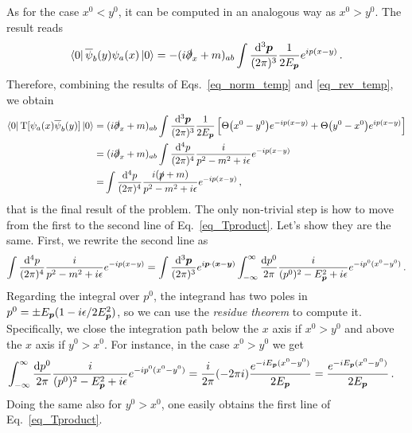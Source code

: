 \begin{sol}
    As for the case $x^0 < y^0$, it can be computed in an analogous way as $x^0 > y^0$. The result reads
    \begin{equation}
    \label{eq_rev_temp}
        \bra{0}\overline{\psi}_b(y)\psi_{a}(x)\ket{0} = -(i\slashed{\partial}_{x} + m)_{ab}\int \frac{{\rm d}^{3} \boldsymbol{p}}{(2\pi)^{3}}\frac{1}{2E_{\boldsymbol{p}}}e^{ip(x-y)} \, .
    \end{equation}
    Therefore, combining the results of Eqs.~\eqref{eq_norm_temp} and \eqref{eq_rev_temp}, we obtain
    \begin{equation} \label{eq_Tproduct}
    \begin{split}
        \bra{0}\mathbf{\rm T}[\psi_{a}(x)\overline{\psi}_b(y)]\ket{0} 
        = &\; (i\slashed{\partial}_{x} + m)_{ab} \int \frac{{\rm d}^{3}\boldsymbol{p}}{(2\pi)^{3}}\frac{1}{2E_{\boldsymbol{p}}} \left[\Theta\big(x^0 - y^0\big)e^{-ip(x-y)} + \Theta\big(y^0 - x^0\big) e^{ip(x-y)}\right] \\
        = &\; (i\slashed{\partial}_{x} + m)_{ab}\int \frac{{\rm d}^{4}p}{(2\pi)^{4}} \frac{i}{p^{2} - m^{2} + i\epsilon} e^{-ip(x-y)} \\
        = & \int \frac{{\rm d}^{4}p}{(2\pi)^{4}} \frac{i (\slashed{p} + m)}{p^{2} - m^{2} + i\epsilon}e^{-ip(x-y)}\, ,
    \end{split}
    \end{equation}
    that is the final result of the problem. The only non-trivial step is how to move from the first to the second line of Eq.~\eqref{eq_Tproduct}. Let's show they are the same. First, we rewrite the second line as
    \begin{equation}
        \int \frac{{\rm d}^{4}p}{(2\pi)^{4}} \frac{i}{p^{2} - m^{2} + i\epsilon} e^{-ip(x-y)} = \int \frac{{\rm d}^{3}\boldsymbol{p}}{(2\pi)^{3}}e^{i\boldsymbol{p}\cdot(\boldsymbol{x}-\boldsymbol{y})}\int_{-\infty}^{\infty}\frac{{\rm d} p^{0}}{2\pi}\frac{i}{(p^{0})^{2} - E_{\boldsymbol{p}}^{2} + i\epsilon} e^{-ip^{0}(x^{0}-y^{0})}\, .
    \end{equation}
    Regarding the integral over $p^{0}$, the integrand has two poles in $p^{0} = \pm E_{\boldsymbol{p}}(1 - i\epsilon / 2 E_{\boldsymbol{p}}^{2})$, so we can use the \emph{residue theorem} to compute it. Specifically, we close the integration path below the $x$ axis if $x^0 > y^0$ and above the $x$ axis if $y^0 > x^0$. For instance, in the case $x^0 > y^0$ we get
    \begin{equation}
        \begin{split}
            \int_{-\infty}^{\infty}\frac{{\rm d} p^{0}}{2\pi} \frac{i}{(p^{0})^{2} - E_{\boldsymbol{p}}^{2} + i\epsilon}e^{-ip^{0}(x^{0}-y^{0})} &= \frac{i}{2\pi}(-2\pi i)\frac{e^{-i E_{\boldsymbol{p}}(x^{0} - y^{0})}}{2E_{\boldsymbol{p}}} = \frac{e^{-i E_{\boldsymbol{p}}(x^{0} - y^{0})}}{2E_{\boldsymbol{p}}} \, .
        \end{split}
    \end{equation}
    Doing the same also for $y^0 > x^0$, one easily obtains the first line of Eq.~\eqref{eq_Tproduct}.


\end{sol}
